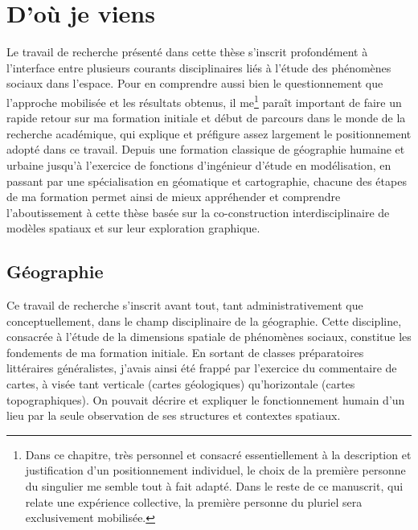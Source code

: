 \section{D'où je viens \label{sec:formation}}

Le travail de recherche présenté dans cette thèse s'inscrit profondément à l'interface entre plusieurs courants disciplinaires liés à l'étude des phénomènes sociaux dans l'espace.
Pour en comprendre aussi bien le questionnement que l'approche mobilisée et les résultats obtenus, il me\footnote{
	Dans ce chapitre, très personnel et consacré essentiellement à la description et justification d'un positionnement individuel, le choix de la première personne du singulier me semble tout à fait adapté.
	Dans le reste de ce manuscrit, qui relate une expérience collective, la première personne du pluriel sera exclusivement mobilisée.
} paraît important de faire un rapide retour sur ma formation initiale et début de parcours dans le monde de la recherche académique, qui explique et préfigure assez largement le positionnement adopté dans ce travail.
Depuis une formation classique de géographie humaine et urbaine jusqu'à l'exercice de fonctions d'ingénieur d'étude en modélisation, en passant par une spécialisation en géomatique et cartographie, chacune des étapes de ma formation permet ainsi de mieux appréhender et comprendre l'aboutissement à cette thèse basée sur la co-construction interdisciplinaire de modèles spatiaux et sur leur exploration graphique.

\subsection{Géographie}

Ce travail de recherche s'inscrit avant tout, tant administrativement que conceptuellement, dans le champ disciplinaire de la géographie.
Cette discipline, consacrée à l'étude de la dimensions spatiale de phénomènes sociaux, constitue les fondements de ma formation initiale.
En sortant de classes préparatoires littéraires généralistes, j'avais ainsi été frappé par l'exercice du commentaire de cartes, à visée tant verticale (cartes géologiques) qu'horizontale (cartes topographiques).
On pouvait décrire et expliquer le fonctionnement humain d'un lieu par la seule observation de ses structures et contextes spatiaux.

